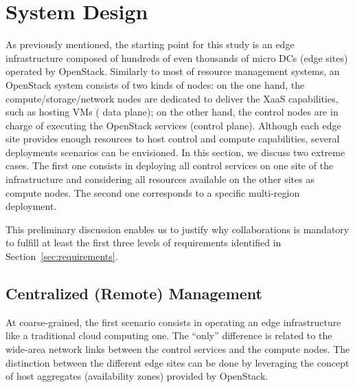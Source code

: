 

\section{System Design}
\label{sec:system_design_considerations}
As previously mentioned, the starting point for this study is an edge
infrastructure composed of hundreds of even thousands of micro DCs (\aka edge sites) operated by OpenStack.
%
Similarly to most of resource management systems, an OpenStack system consists of two kinds
of nodes: on the one hand, the compute/storage/network nodes are
dedicated to deliver the XaaS capabilities, such as hosting VMs (\ie
data plane); on the other hand, the control nodes are in charge of
executing the OpenStack services (\ie control plane).
%
Although each edge site provides enough resources to host control and
compute capabilities, several deployments scenarios can be
envisioned.
%
In this section, we discuss two extreme cases. The first one
consists in deploying all control services on one site of the
infrastructure and considering all resources available on the other sites as compute
nodes.  The second one corresponds to a specific multi-region deployment.
%

This preliminary discussion enables us to justify why collaborations is mandatory to
fulfill at least the first three levels of requirements identified in Section~\ref{sec:requirements}.
%

\subsection{Centralized (Remote) Management}
\label{subsec:centralized_os}
At coarse-grained, the first scenario consists in operating an edge
infrastructure like a traditional cloud computing one.  The ``only''
difference is related to the wide-area network links between the
control services and the compute nodes.  The distinction between the
different edge sites can be done by leveraging the concept of host
aggregates (\aka availability zones) provided by OpenStack.

